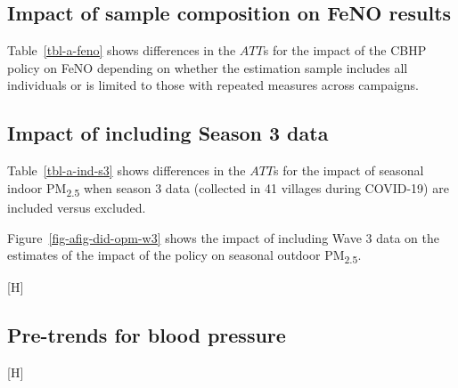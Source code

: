 \documentclass[
  letterpaper,
  DIV=11,
  numbers=noendperiod]{scrartcl}
\makeatletter
\renewenvironment{figure}%
   {\renewcommand\familydefault\sfdefault
    \@float{figure}}
   {\end@float}
\makeatother
\begin{document}
\newpage

\subsection{Impact of sample composition on FeNO
results}\label{impact-of-sample-composition-on-feno-results}

Table~\ref{tbl-a-feno} shows differences in the \(ATT\)s for the impact
of the CBHP policy on FeNO depending on whether the estimation sample
includes all individuals or is limited to those with repeated measures
across campaigns.

\newpage

\subsection{Impact of including Season 3
data}\label{impact-of-including-season-3-data}

Table~\ref{tbl-a-ind-s3} shows differences in the \(ATT\)s for the
impact of seasonal indoor PM\textsubscript{2.5} when season 3 data
(collected in 41 villages during COVID-19) are included versus excluded.

Figure~\ref{fig-afig-did-opm-w3} shows the impact of including Wave 3
data on the estimates of the impact of the policy on seasonal outdoor
PM\textsubscript{2.5}.

\begin{figure}[H]

\caption{\label{fig-afig-did-opm-w3}Effects of the CBHP policy on
outdoor seasonal PM\textsubscript{2.5} based on whether Season 3 data
are included vs.~excluded.}


\end{figure}%

\newpage

\subsection{Pre-trends for blood
pressure}\label{pre-trends-for-blood-pressure}

\begin{figure}[H]

\caption{\label{fig-afig-pt3}Comparison of pre-interventions trends in
blood pressure between waves 1 and 2 for never treated and villages
later treated in wave 3}


\end{figure}%
\end{document}
